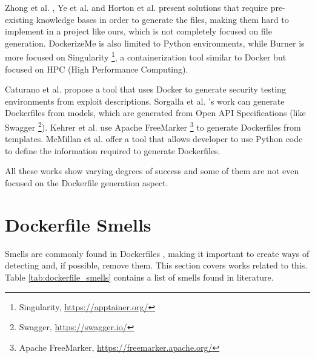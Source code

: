 Zhong et al. \cite{zhongBurnerRecipeAutomatic2022}, Ye et al. \cite{yeDockerGenKnowledgeGraph2021} and Horton et al. \cite{hortonDockerizeMeAutomaticInference2019} present solutions that require pre-existing knowledge bases in order to generate the files, making them hard to implement in a project like ours, which is not completely focused on file generation. DockerizeMe is also limited to Python environments, while Burner is more focused on Singularity \footnote{Singularity, \url{https://apptainer.org/}}, a containerization tool similar to Docker but focused on HPC (High Performance Computing).



Caturano et al. \cite{caturanoExploitWP2DockerPlatformAutomating2022} propose a tool that uses Docker to generate security testing environments from exploit descriptions. Sorgalla et al. \cite{sorgallaApplyingModelDrivenEngineering2021}'s work can generate Dockerfiles from models, which are generated from Open API Specifications (like Swagger \footnote{Swagger, \url{https://swagger.io/}}). Kehrer et al. \cite{kehrerContainerBasedModuleIsolation2019} use Apache FreeMarker \footnote{Apache FreeMarker, \url{https://freemarker.apache.org/}} to generate Dockerfiles from templates. McMillan et al. \cite{mcmillanMAKINGCONTAINERSEASIER} offer a tool that allows developer to use Python code to define the information required to generate Dockerfiles.

All these works show varying degrees of success and some of them are not even focused on the Dockerfile generation aspect.

\section{Dockerfile Smells} \label{sec:dockerfile_smells}

Smells are commonly found in Dockerfiles \cite{wuCharacterizingOccurrenceDockerfile2020}, making it important to create ways of detecting and, if possible, remove them. This section covers works related to this. Table \ref{tab:dockerfile_smells} contains a list of smells found in literature.

